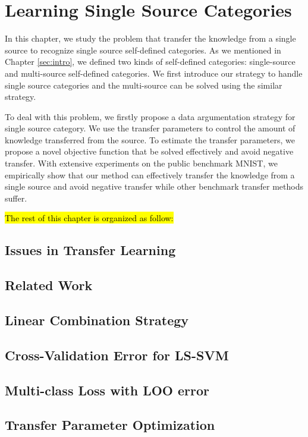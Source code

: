 \chapter{Learning Single Source Categories}
In this chapter, we study the problem that transfer the knowledge from a single source to recognize single source self-defined categories. As we mentioned in Chapter \ref{sec:intro}, we defined two kinds of self-defined categories: single-source and multi-source self-defined categories. We first introduce our strategy to handle single source categories and the multi-source can be solved using the similar strategy.

To deal with this problem, we firstly propose a data argumentation strategy for single source category. We use the transfer parameters to control the amount of knowledge transferred from the source. To estimate the transfer parameters, we propose a novel objective function that be solved effectively and avoid negative transfer. With extensive experiments on the public benchmark MNIST, we empirically show that our method can effectively transfer the knowledge from a single source and avoid negative transfer while other benchmark transfer methods suffer.

\hl{The rest of this chapter is organized as follow:}
\section{Issues in Transfer Learning}

\section{Related Work}\label{sec:single:rl}

\section{Linear Combination Strategy}\label{sec:single:comb}

\section{Cross-Validation Error for LS-SVM}

\section{Multi-class Loss with LOO error}

\section{Transfer Parameter Optimization}
